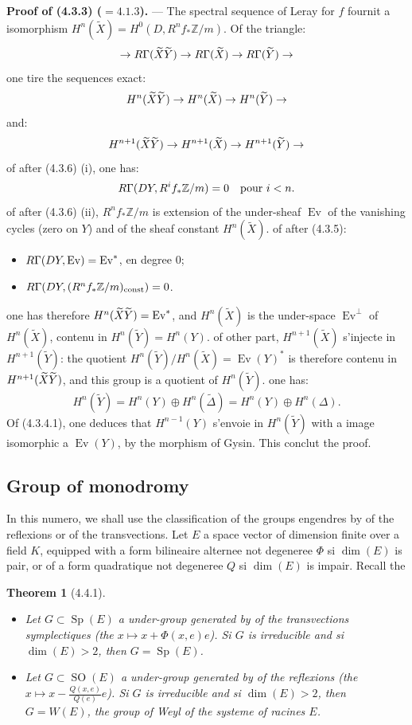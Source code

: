 \documentclass[12pt,a4paper]{article}
\theoremstyle{plain}
\newtheorem{theorem}{Theorem}[section]
\theoremstyle{definition}
\theoremstyle{remark}
\newcommand{\const}{\text{const}}
\DeclareMathOperator{\Sp}{Sp}
\DeclareMathOperator{\SO}{SO}
\DeclareMathOperator{\Ev}{Ev}
\let\mod\relax
\DeclareMathOperator{\mod}{mod}
\newcommand{\bbZ}{\mathbb{Z}}
\begin{document}
\textbf{Proof of (4.3.3) ($=4.1.3$).} --- The spectral sequence of Leray for $f$ fournit a isomorphism $H^n(\widetilde{X}) = H^0(D, R^n f_* \bbZ/m)$. Of the triangle:
\[
\to R\Gamma(\widetilde{X} \mod \widetilde{Y}) \to R\Gamma(\widetilde{X}) \to R\Gamma(\widetilde{Y}) \to
\]
one tire the sequences exact:
\[
H^n(\widetilde{X} \mod \widetilde{Y}) \to H^n(\widetilde{X}) \to H^n(\widetilde{Y}) \to
\]
and:
\[
H^{n+1}(\widetilde{X} \mod \widetilde{Y}) \to H^{n+1}(\widetilde{X}) \to H^{n+1}(\widetilde{Y}) \to
\]
of after (4.3.6) (i), one has:
\[
R\Gamma(D \mod Y, R^i f_* \bbZ/m) = 0 \quad \text{pour } i < n.
\]
of after (4.3.6) (ii), $R^n f_* \bbZ/m$ is extension of the under-sheaf $\Ev$ of the vanishing cycles (zero on $Y$) and of the sheaf constant $H^n(\widetilde{X})$. of after (4.3.5):
\begin{itemize}
\item[(i)] $R\Gamma(D \mod Y, \Ev) = \Ev^*$, en degree $0$;
\item[(ii)] $R\Gamma(D \mod Y, (R^n f_* \bbZ/m)_{\const}) = 0$.
\end{itemize}
one has therefore $H^n(\widetilde{X} \mod \widetilde{Y}) = \Ev^*$, and $H^n(\widetilde{X})$ is the under-space $\Ev^\perp$ of $H^n(\widetilde{X})$, contenu in $H^n(\widetilde{Y}) = H^n(Y)$. of other part, $H^{n+1}(\widetilde{X})$ s'injecte in $H^{n+1}(\widetilde{Y})$: the quotient $H^n(\widetilde{Y}) / H^n(\widetilde{X}) = \Ev(Y)^*$ is therefore contenu in $H^{n+1}(\widetilde{X} \mod \widetilde{Y})$, and this group is a quotient of $H^n(\widetilde{Y})$. one has:
\[
H^n(\widetilde{Y}) = H^n(Y) \oplus H^n(\widetilde{\Delta}) = H^n(Y) \oplus H^n(\Delta).
\]
Of (4.3.4.1), one deduces that $H^{n-1}(Y)$ s'envoie in $H^n(\widetilde{Y})$ with a image isomorphic a $\Ev(Y)$, by the morphism of Gysin. This conclut the proof.

\subsection{Group of monodromy}

In this numero, we shall use the classification of the groups engendres by of the reflexions or of the transvections. Let $E$ a space vector of dimension finite over a field $K$, equipped with a form bilineaire alternee not degeneree $\Phi$ si $\dim(E)$ is pair, or of a form quadratique not degeneree $Q$ si $\dim(E)$ is impair. Recall the

\begin{theorem}[4.4.1]
\ \begin{itemize}
\item[(i)] Let $G \subset \Sp(E)$ a under-group generated by of the transvections symplectiques (the $x \mapsto x + \Phi(x, e)e$). Si $G$ is irreducible and si $\dim(E) > 2$, then $G = \Sp(E)$.
\item[(ii)] Let $G \subset \SO(E)$ a under-group generated by of the reflexions (the $x \mapsto x - \frac{Q(x,e)}{Q(e)}e$). Si $G$ is irreducible and si $\dim(E) > 2$, then $G = W(E)$, the group of Weyl of the systeme of racines $E$.
\end{itemize}
\end{theorem}
\end{document}
